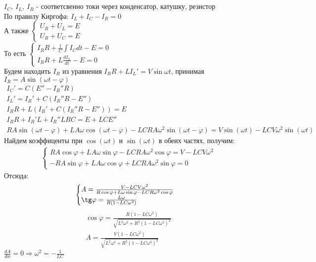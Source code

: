 \documentclass{article}
\begin{document}
\section{}
\label{sec:org648e7de}
\(I_C,\ I_L,\ I_R\) - соответсвенно токи через конденсатор, катушку, резистор \\
По правилу Киргофа: \(I_L + I_C - I_R = 0\) \\
А также \(\begin{cases}U_R + U_L = E \\ U_R + U_C = E \end{cases}\) \\
То есть \(\begin{cases}I_R R + \frac{1}{C}\int I_C dt - E = 0\\ I_R R + L \frac{dI_L}{dt} - E = 0 \end{cases}\) \\
Будем находить \(I_R\) из уравнения \(I_R R + L I_L' = V\sin \omega t\), принимая \(I_R = A\sin(\omega t - \varphi)\) \\
\begin{gather*}
I_C' = C(E'' - I_R''R) \\
I_L' = I_R' + C(I_R''R - E'') \\
I_R R + L(I_R' + C(I_R''R - E'')) = E \\
I_R R + I_R'L + I_R''LRC = E + LCE'' \\
RA\sin(\omega t - \varphi) + LA\omega \cos(\omega t - \varphi) - LCRA\omega^2\sin(\omega t - \varphi) = V\sin(\omega t) - LCV\omega^2\sin(\omega t)
\end{gather*}
Найдем коэффиценты при \(\cos(\omega t)\) и \(\sin(\omega t)\) в обеих частях, получим: \\
\begin{align*}
\begin{cases}
RA\cos \varphi + LA\omega\sin \varphi - LCRA\omega^2\cos \varphi = V - LCV\omega^2 \\
-RA\sin \varphi + LA\omega\cos \varphi + LCRA\omega^2\sin \varphi = 0
\end{cases}
\end{align*}
Отсюда: 
\begin{align*}
\begin{cases}
A = \frac{V - LCV\omega^2}{R\cos \varphi + L\omega\sin \varphi - LCR\omega^2\cos \varphi} \\
\tg\varphi = \frac{L\omega}{R(1 - LC\omega^2)}
\end{cases}
\end{align*}
\begin{gather*}
\cos\varphi = \frac{R(1 - LC\omega^2)}{\sqrt{L^2\omega^2 + R^2(1-LC\omega^2)^2}} \\
A = \frac{V(1-LC\omega^2)}{\sqrt{L^2\omega^2 + R^2(1 - LC\omega^2)^2}}
\end{gather*}
\(\frac{dA}{dw} = 0 \Rightarrow \omega^2 = -\frac{1}{LC}\)
\section{}
\label{sec:orgd889739}
\end{document}
